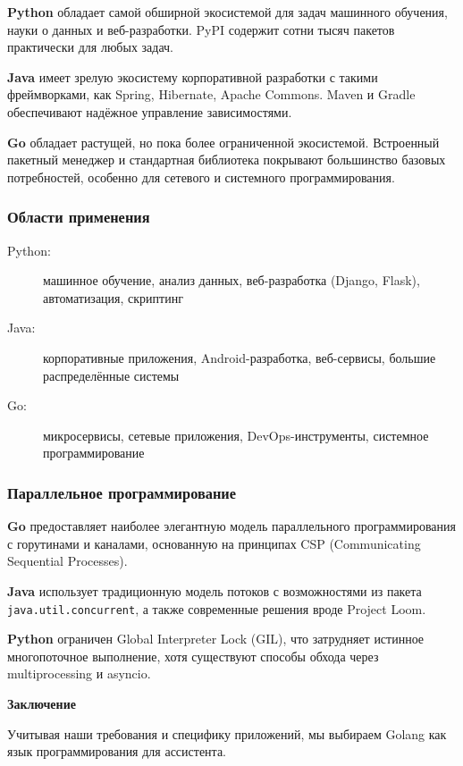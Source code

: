\textbf{Python} обладает самой обширной экосистемой для задач машинного обучения, науки о данных и веб-разработки. PyPI содержит сотни тысяч пакетов практически для любых задач.

\textbf{Java} имеет зрелую экосистему корпоративной разработки с такими фреймворками, как Spring, Hibernate, Apache Commons. Maven и Gradle обеспечивают надёжное управление зависимостями.

\textbf{Go} обладает растущей, но пока более ограниченной экосистемой. Встроенный пакетный менеджер и стандартная библиотека покрывают большинство базовых потребностей, особенно для сетевого и системного программирования.

\subsubsection*{Области применения}

\begin{description}
    \item[Python:] машинное обучение, анализ данных, веб-разработка (Django, Flask), автоматизация, скриптинг
    \item[Java:] корпоративные приложения, Android-разработка, веб-сервисы, большие распределённые системы
    \item[Go:] микросервисы, сетевые приложения, DevOps-инструменты, системное программирование
\end{description}

\subsubsection*{Параллельное программирование}

\textbf{Go} предоставляет наиболее элегантную модель параллельного программирования с горутинами и каналами, основанную на принципах CSP (Communicating Sequential Processes).

\textbf{Java} использует традиционную модель потоков с возможностями из пакета \texttt{java.util.concurrent}, а также современные решения вроде Project Loom.

\textbf{Python} ограничен Global Interpreter Lock (GIL), что затрудняет истинное многопоточное выполнение, хотя существуют способы обхода через multiprocessing и asyncio.


\textbf{Заключение}

Учитывая наши требования и специфику приложений, мы выбираем Golang как язык программирования для ассистента.

